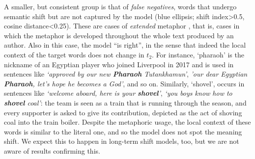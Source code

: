 A smaller, but consistent group is that of \textit{false negatives}, 
words that undergo semantic shift but are not captured by the model
(blue ellipsis; shift index\textgreater 0.5, cosine distance\textless 0.25).
 
These are cases of \textit{extended}
metaphor \cite{werth1994extended}, that is, cases in which the metaphor is 
developed throughout the whole text produced by an author. Also in this case, the model ``is right'', in the sense that indeed
the local context of the target words does not change in $t_2$.
For instance, `pharaoh' is the nickname of an Egyptian player who
joined Liverpool in 2017 and is used in
sentences like \textit{`approved by our new \textbf{Pharaoh}
  Tutankhamun'}, \textit{'our dear Egyptian \textbf{Pharaoh},
  let's hope he becomes a God'}, and so on. Similarly, `shovel',  occurs in sentences
like \textit{`welcome aboard, here is your \textbf{shovel}'},
\textit{`you boys know how to \textbf{shovel} coal'}: the team is seen as a train that is running through the season, and every supporter is asked to give its contribution, depicted as the act of shoving coal into the train boiler. Despite the metaphoric usage, the local context of these words is similar to the literal one, and so the model does not spot the meaning shift. We expect this to happen in long-term shift models, too, but we are not aware of results confirming this.



